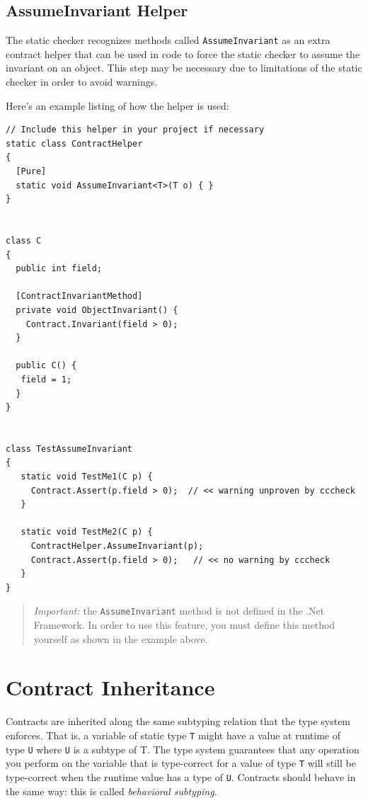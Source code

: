 \documentclass{article}
\newcommand{\code}[1]{\lstinline{#1}}
\begin{document}
\subsection{AssumeInvariant Helper}
\label{sec:assumeinvarianthelper}
The static checker recognizes methods called \code{AssumeInvariant} as
an extra contract helper that can be used in code to force the static
checker to assume the invariant on an object. This step may be
necessary due to limitations of the static checker in order to avoid warnings.

Here's an example listing of how the helper is used:
\begin{lstlisting}
// Include this helper in your project if necessary
static class ContractHelper
{
  [Pure]
  static void AssumeInvariant<T>(T o) { }
}


class C
{
  public int field;

  [ContractInvariantMethod]
  private void ObjectInvariant() {
    Contract.Invariant(field > 0);
  }

  public C() {
   field = 1;
  }
}


class TestAssumeInvariant
{
   static void TestMe1(C p) {
     Contract.Assert(p.field > 0);  // << warning unproven by cccheck
   }

   static void TestMe2(C p) {
     ContractHelper.AssumeInvariant(p);
     Contract.Assert(p.field > 0);   // << no warning by cccheck
   }
}
\end{lstlisting}

\begin{quote}
\emph{Important:} the \code{AssumeInvariant} method
is not defined in the .Net Framework. In order to use this
feature, you must define this method yourself as shown in the example above.
\end{quote}

\section{Contract Inheritance}
\label{sec:inheritance}
Contracts are inherited along the same subtyping relation that the type system enforces.
That is, a variable of static type \code{T} might have a value at runtime of type \code{U}
where \code{U} is a subtype of {T}.
The type system guarantees that any operation you perform on the variable that is type-correct
for a value of type \code{T} will still be type-correct when the runtime value has a type of \code{U}.
Contracts should behave in the same way: this is called {\em behavioral subtyping}.
\end{document}
